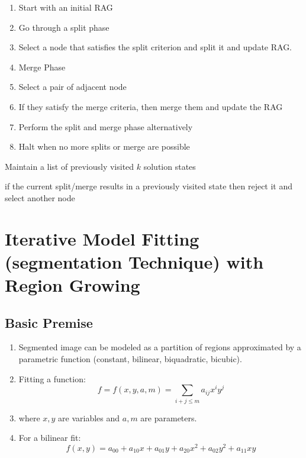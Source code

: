 \documentclass[11pt]{article}
\theoremstyle{definition}
\begin{document}
\begin{enumerate}
    \item Start with an initial RAG
    \item Go through a split phase
    \item[-] Select a node that satisfies the split criterion and split it and update RAG.
    \item Merge Phase
    \item[-] Select a pair of adjacent node
    \item[-] If they satisfy the merge criteria, then merge them and update the RAG
    \item Perform the split and merge phase alternatively
    \item Halt when no more splits or merge are possible
\end{enumerate}

Maintain a list of previously visited $k$ solution states

if the current split/merge results in a previously visited state then reject it and select another node



\newpage
\section{Iterative Model Fitting (segmentation Technique) with Region Growing}


\subsection*{Basic Premise}

\begin{enumerate}
    \item Segmented image can be modeled as a partition of regions approximated by a parametric function 
    (constant, bilinear, biquadratic, bicubic).

    \item Fitting a function:
    \[
    f = f(x, y, a, m) = \sum_{i+j \le m} a_{ij} x^i y^j
    \]

    \item[] where $x, y$ are variables and $a, m$ are parameters.

    \item For a bilinear fit:
    \[
    f(x, y) = a_{00} + a_{10}x + a_{01}y + a_{20}x^2 + a_{02}y^2 + a_{11}xy
    \]
\end{enumerate}
\end{document}
